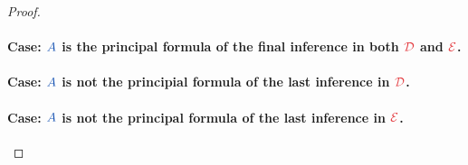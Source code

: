 \begin{proof}
  \paragraph{Case: $\prp{A}$ is the principal formula of the final inference
  in both $\prf{D}$ and $\prf{E}$.}\quad

  \paragraph{Case: $\prp{A}$ is not the principial formula of the last
  inference in $\prf{D}$.}\quad

  \paragraph{Case: $\prp{A}$ is not the principal formula of the last
  inference in $\prf{E}$.}\quad

\end{proof}




